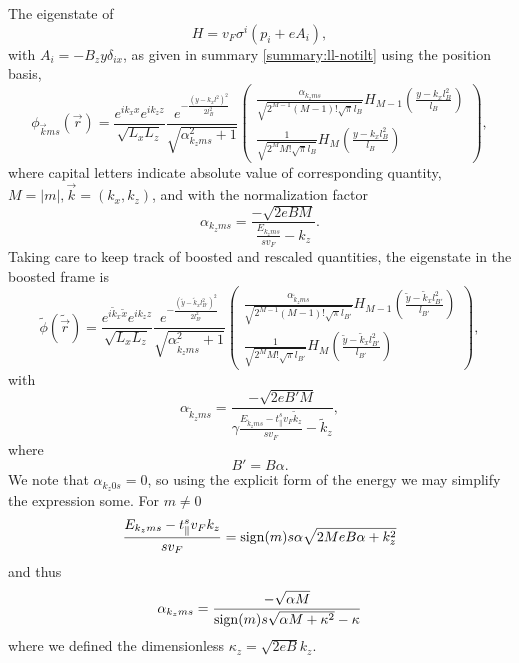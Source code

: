 The eigenstate of
\[
H = v_{F} \sigma ^{i} ( p_{i} + e A_{i} ),
\]
with \(A_{i} = - B_{z} y \delta _{i x}\), as given in summary \ref{summary:ll-notilt} using the position basis,
\begin{equation*}
  \phi _{\vec{k} m s}(\vec{r}) =  \frac{e^{ik_x x}e^{ik_z z}}{\sqrt{L_xL_z}}
  \frac{e^{-\frac{(y-k_x l^2)^2}{2 l_B^2}}}{\sqrt{\alpha_{k_z m s}^2 + 1}}
  \begin{pmatrix}
    \frac{\alpha_{k_z m s}}{\sqrt{2^{M-1} (M-1)! \sqrt{\pi } l_B}} H_{M-1}\left( \frac{y-k_x l_B^2}{l_B} \right)\\
    \frac{1}{\sqrt{2^M M! \sqrt{\pi } l_B}} H_M \left( \frac{y-k_x l_B^2}{l_B} \right)
  \end{pmatrix},
\end{equation*}
where capital letters indicate absolute value of corresponding quantity, $M=|m|, \vec{k} = (k_x, k_z)$, and with the normalization factor
\begin{equation}
  \alpha_{k_z m s} = \frac{-\sqrt{2eB M}}{\frac{E_{k_z m s}}{s v_{F}} -   k_z}.
\end{equation}
Taking care to keep track of boosted and rescaled quantities, the eigenstate in the boosted frame is
\begin{equation}
  \label{eq:47}
  \tilde{\phi}(\tilde{\vec{r}}) =
  \frac{e^{i \tilde{k}_x \tilde{x}}e^{i k_z z}}{\sqrt{L_xL_z}}
  \frac{e^{-\frac{\left(\tilde{y} - \tilde{k}_x l_{B'}^2\right)^2}{2 l_{B'}^2}}}{\sqrt{\alpha_{\tilde{k}_z m s}^2 + 1}}
  \begin{pmatrix}
    \frac{\alpha_{\tilde{k}_z m s}}{\sqrt{2^{M-1} (M-1)! \sqrt{\pi } l_{B'}}} H_{M-1}\left( \frac{\tilde{y} - \tilde{k}_x l_{B'}^2}{l_{B'}} \right)\\
    \frac{1}{\sqrt{2^M M! \sqrt{\pi } l_{B'}}} H_M \left( \frac{\tilde{y} - \tilde{k}_x l_{B'}^2}{l_{B'}} \right)
  \end{pmatrix},
\end{equation}
with
\begin{equation}
  \alpha_{\tilde{k}_z m s} = \frac{-\sqrt{2e B'  M}}{ \gamma \frac{E_{\tilde{k}_z m s} - t^s_{\parallel} v_{F} \tilde{k}_{z}}{s v_{F}} -   \tilde{k}_z},
\end{equation}
where
\[
B' = B \alpha.
\]
We note that \( \alpha_{k_z 0 s} = 0 \), so using the explicit form of the energy we may simplify the expression some.
For \( m\neq 0 \)
\[
  \frac{
    E_{k_z m s} - t^s_{\parallel} v_F k_z
  }{s v_{F}} = \operatorname{sign}(m) s \alpha \sqrt{2 M e B \alpha + k_{z}^2}
\]
and thus
\begin{equation}
  \label{eq:48}
  \alpha_{k_z m s} =
  \frac{-\sqrt{ \alpha M }}{\operatorname{sign}(m) s \sqrt{\alpha M + \kappa^2} - \kappa}
\end{equation}
where we defined the dimensionless \( \kappa_z = \sqrt{2 e B} k_z  \).

